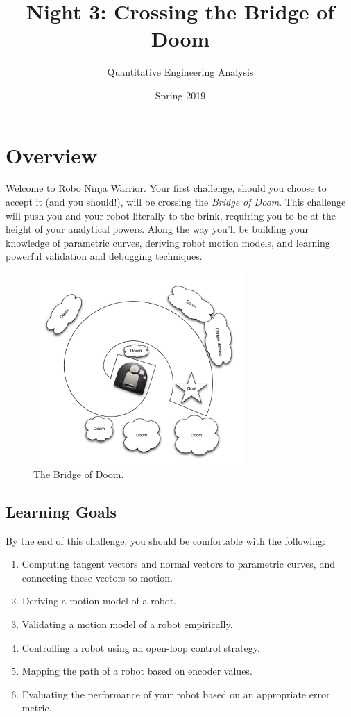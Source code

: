 \documentclass{tufte-handout}
\title{Night 3: Crossing the Bridge of Doom}
\author{Quantitative Engineering Analysis}
\date{Spring 2019}
\def \BoD {Bridge of Doom\texttrademark}
\begin{document}
\maketitle
\thispagestyle{firstpage}

\section{Overview}
Welcome to Robo Ninja Warrior.  Your first challenge, should you choose to accept it (and you should!), will be crossing the \emph{\BoD}.  This challenge will push you and your robot literally to the brink, requiring you to be at the height of your analytical powers.  Along the way you'll be building your knowledge of parametric curves, deriving robot motion models, and learning powerful validation and debugging techniques.
\begin{figure}
\begin{center}
\includegraphics[width=8cm]{figures/bridge_sketch}
\end{center}
\caption{The \BoD. \label{fig:bridge_sketch}}
\end{figure}

\subsection{Learning Goals}

By the end of this challenge, you should be comfortable with the following:
\begin{enumerate}
\item Computing tangent vectors and normal vectors to parametric curves, and connecting these vectors to motion.
\item Deriving a motion model of a robot.
\item Validating a motion model of a robot empirically.
\item Controlling a robot using an open-loop control strategy.
\item Mapping the path of a robot based on encoder values.
\item Evaluating the performance of your robot based on an appropriate error metric.
\end{enumerate}
\end{document}
